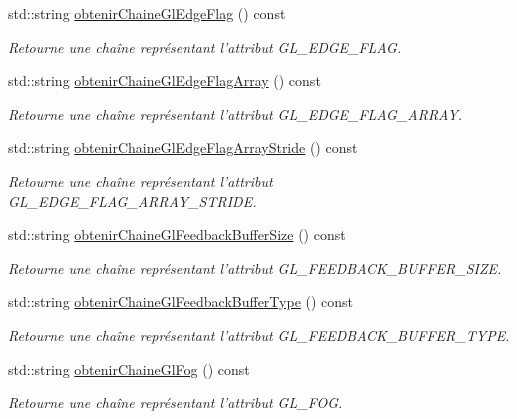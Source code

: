 \begin{DoxyCompactItemize}
std\-::string \hyperlink{group__utilitaire_ga982e0dacd18861db40bc153b8e7748d6}{obtenir\-Chaine\-Gl\-Edge\-Flag} () const 
\begin{DoxyCompactList}\small\item\em Retourne une chaîne représentant l'attribut G\-L\-\_\-\-E\-D\-G\-E\-\_\-\-F\-L\-A\-G. \end{DoxyCompactList}\item 
std\-::string \hyperlink{group__utilitaire_gac69166db434f3671eb241b00786be34b}{obtenir\-Chaine\-Gl\-Edge\-Flag\-Array} () const 
\begin{DoxyCompactList}\small\item\em Retourne une chaîne représentant l'attribut G\-L\-\_\-\-E\-D\-G\-E\-\_\-\-F\-L\-A\-G\-\_\-\-A\-R\-R\-A\-Y. \end{DoxyCompactList}\item 
std\-::string \hyperlink{group__utilitaire_ga12932637a943b952d6c822af48b4102a}{obtenir\-Chaine\-Gl\-Edge\-Flag\-Array\-Stride} () const 
\begin{DoxyCompactList}\small\item\em Retourne une chaîne représentant l'attribut G\-L\-\_\-\-E\-D\-G\-E\-\_\-\-F\-L\-A\-G\-\_\-\-A\-R\-R\-A\-Y\-\_\-\-S\-T\-R\-I\-D\-E. \end{DoxyCompactList}\item 
std\-::string \hyperlink{group__utilitaire_gab0ae8d230f1fe733862032e082cfbd2f}{obtenir\-Chaine\-Gl\-Feedback\-Buffer\-Size} () const 
\begin{DoxyCompactList}\small\item\em Retourne une chaîne représentant l'attribut G\-L\-\_\-\-F\-E\-E\-D\-B\-A\-C\-K\-\_\-\-B\-U\-F\-F\-E\-R\-\_\-\-S\-I\-Z\-E. \end{DoxyCompactList}\item 
std\-::string \hyperlink{group__utilitaire_ga30bdbc77ee2c0b27ee48e5de2654d29c}{obtenir\-Chaine\-Gl\-Feedback\-Buffer\-Type} () const 
\begin{DoxyCompactList}\small\item\em Retourne une chaîne représentant l'attribut G\-L\-\_\-\-F\-E\-E\-D\-B\-A\-C\-K\-\_\-\-B\-U\-F\-F\-E\-R\-\_\-\-T\-Y\-P\-E. \end{DoxyCompactList}\item 
std\-::string \hyperlink{group__utilitaire_ga73b3d82b8c3940a818e1dab3d69e4899}{obtenir\-Chaine\-Gl\-Fog} () const 
\begin{DoxyCompactList}\small\item\em Retourne une chaîne représentant l'attribut G\-L\-\_\-\-F\-O\-G. \end{DoxyCompactList}\item 

\end{DoxyCompactItemize}
